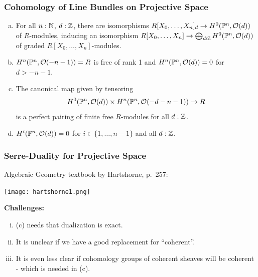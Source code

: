 \documentclass{beamer}
\begin{document}
\begin{frame}
  \frametitle{Cohomology of Line Bundles on Projective Space}
\begin{theorem}
  \label{calculate-cohomology-twisting-sheaves}
  \begin{enumerate}[(a)]
  \item \label{calculate-cohomology-twisting-sheaves-a}
  For all $n:\mathbb{N}$, $d:\mathbb{Z}$, there are isomorphisms $R[X_0,\dots,X_n]_d\to H^0(\mathbb{P}^n,\mathcal O(d))$ of $R$-modules, inducing an isomorphism $R[X_0,\dots,X_n]\to \bigoplus_{d:\mathbb{Z}} H^0(\mathbb{P}^n,\mathcal O(d))$ of graded $R[X_0,\dots,X_n]$-modules.
  \item \label{calculate-cohomology-twisting-sheaves-b}
        $H^n(\mathbb{P}^n,\mathcal O(-n-1))=R$ is free of rank 1 and $H^n(\mathbb{P}^n,\mathcal O(d))=0$ for $d>-n-1$.
  \item \label{calculate-cohomology-twisting-sheaves-c}
    The canonical map given by tensoring
    \[
      H^0(\mathbb{P}^n,\mathcal O(d)) \times H^n(\mathbb{P}^n,\mathcal O(-d-n-1))\to R
    \]
    is a perfect pairing of finite free $R$-modules for all $d:\mathbb{Z}$.
  \item $H^i(\mathbb{P}^n,\mathcal O(d))=0$ for $i\in\{1,\dots,n-1\}$ and all $d:\mathbb{Z}$.
  \end{enumerate}
\end{theorem}
\end{frame}

\begin{frame}
  \frametitle{Serre-Duality for Projective Space}
  Algebraic Geometry textbook by Hartshorne, p.\ 257: 
  \begin{center}
  \texttt{[image: hartshorne1.png]}    
  \end{center}
  \pause
  \textbf{Challenges:}
  \begin{enumerate}[(i)]
  \item (c) needs that dualization is exact.
  \item It is unclear if we have a good replacement for ``coherent''.
  \item It is even less clear if cohomology groups of coherent sheaves will be coherent - which is needed in (c).
  \end{enumerate}
\end{frame}
\end{document}
